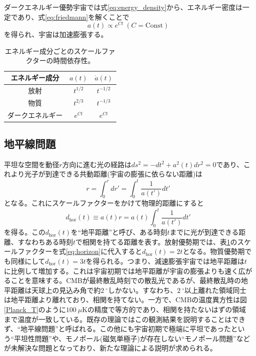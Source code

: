 ダークエネルギー優勢宇宙では式\eqref{eq:energy_density}から、エネルギー密度は一定であり、式\eqref{eq:friedmann}を解くことで
\begin{equation}
  a(t) \propto e^{Ct} ~ (C = \mathrm{Const})
\end{equation}
を得られ、宇宙は加速膨張する。
\begin{table}[htbp]
  \centering
  \caption{エネルギー成分ごとのスケールファクターの時間依存性。}
  \vspace{3mm}
  \begin{tabular}{ccc} \hline
    エネルギー成分 & $a(t)$ & $\dot{a}(t)$ \\ \hline
    放射 & $t^{1/2}$ & $t^{-1/2}$ \\
    物質 & $t^{2/3}$ & $t^{-1/3}$ \\
    ダークエネルギー & $e^{Ct}$ & $e^{Ct}$ \\ \hline
  \end{tabular}
  \label{rad_vs_mat}
\end{table}

\subsection{地平線問題}
平坦な空間を動径$r$方向に進む光の経路は$ds^{2} = -dt^{2} + a^{2}(t)dr^{2} = 0$であり、これより光子が到達できる共動距離(宇宙の膨張に依らない距離)は
\begin{equation}
  r = \int_{0}^{r}dr' = \int_{0}^{t}\frac{1}{a(t')}dt'
\end{equation}
となる。これにスケールファクターをかけて物理的距離にすると
\begin{equation}
  d_{\mathrm{hor}}(t)\equiv a(t)r = a(t)\int_{0}^{t}\frac{1}{a(t')}dt' \label{eq:horizon}
\end{equation}
を得る。この$d_{\mathrm{hor}}(t)$を``地平距離''と呼び、ある時刻$t$までに光が到達できる距離、すなわちある時刻$t$で相関を持てる距離を表す。放射優勢期では、表\ref{rad_vs_mat}のスケールファクターを式\eqref{eq:horizon}に代入すると$d_{\mathrm{hor}}(t) = 2t$となる。物質優勢期でも同様にして$d_{\mathrm{hor}}(t) = 3t$を得られる。つまり、減速膨張宇宙では地平距離は$t$に比例して増加する。これは宇宙初期では地平距離が宇宙の膨張よりも速く広がることを意味する。CMBが最終散乱時刻での散乱光であるが、最終散乱時の地平距離は天球上の見込み角で約$\SI{2}{^{\circ}}$しかない。すなわち、$\SI{2}{^{\circ}}$以上離れた領域同士は地平距離より離れており、相関を持てない。一方で、CMBの温度異方性は図\ref{Planck_T}のように$\SI{100}{\mu\mathrm{K}}$の精度で等方的であり、相関を持たないはずの領域まで温度が一致している。既存の理論ではこの観測結果を説明することはできず、``地平線問題''と呼ばれる。この他にも宇宙初期で極端に平坦であったという``平坦性問題''や、モノポール(磁気単極子)が存在しない``モノポール問題''などが未解決な問題となっており、新たな理論による説明が求められる。

